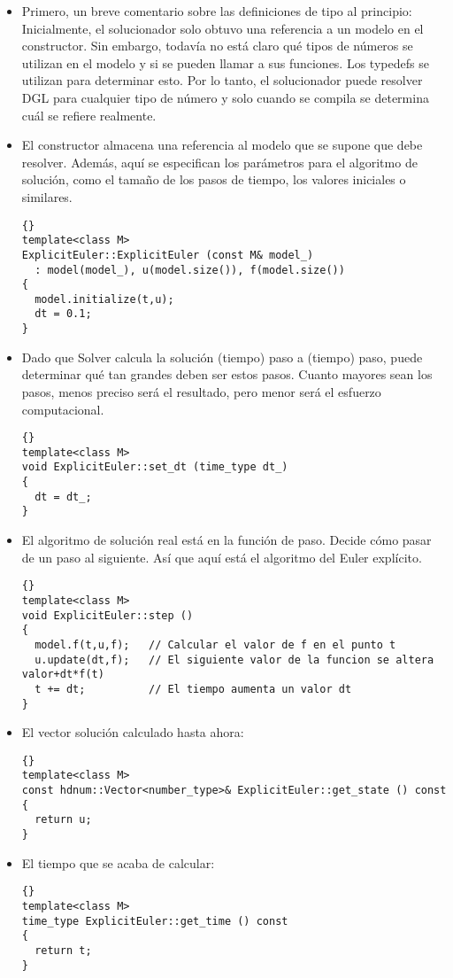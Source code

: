\begin{itemize}
\item Primero, un breve comentario sobre las definiciones de tipo al principio: Inicialmente, el solucionador solo obtuvo una referencia a un modelo en el constructor. Sin embargo, todavía no está claro qué tipos de números se utilizan en el modelo y si se pueden llamar a sus funciones. Los typedefs se utilizan para determinar esto. Por lo tanto, el solucionador puede resolver DGL para cualquier tipo de número y solo cuando se compila se determina cuál se refiere realmente.

\item El constructor almacena una referencia al modelo que se supone que debe resolver. Además, aquí se especifican los parámetros para el algoritmo de solución, como el tamaño de los pasos de tiempo, los valores iniciales o similares.
{\footnotesize{\begin{lstlisting}{}
template<class M>
ExplicitEuler::ExplicitEuler (const M& model_)
  : model(model_), u(model.size()), f(model.size())
{
  model.initialize(t,u);
  dt = 0.1;
}
\end{lstlisting}}}

\item Dado que Solver calcula la solución (tiempo) paso a (tiempo) paso, puede determinar qué tan grandes deben ser estos pasos. Cuanto mayores sean los pasos, menos preciso será el resultado, pero menor será el esfuerzo computacional.

{\footnotesize{\begin{lstlisting}{}
template<class M>
void ExplicitEuler::set_dt (time_type dt_)
{
  dt = dt_;
}
\end{lstlisting}}}

\item El algoritmo de solución real está en la función de paso. Decide cómo pasar de un paso al siguiente. Así que aquí está el algoritmo del Euler explícito.

{\footnotesize{\begin{lstlisting}{}
template<class M>
void ExplicitEuler::step ()
{
  model.f(t,u,f);   // Calcular el valor de f en el punto t
  u.update(dt,f);   // El siguiente valor de la funcion se altera valor+dt*f(t)
  t += dt;          // El tiempo aumenta un valor dt 
}
\end{lstlisting}}}

\item El vector solución calculado hasta ahora:
{\footnotesize{\begin{lstlisting}{}
template<class M>
const hdnum::Vector<number_type>& ExplicitEuler::get_state () const
{
  return u;
}
\end{lstlisting}}}
\item El tiempo que se acaba de calcular:
{\footnotesize{\begin{lstlisting}{}
template<class M>
time_type ExplicitEuler::get_time () const
{
  return t;
}
\end{lstlisting}}}


\end{itemize}
